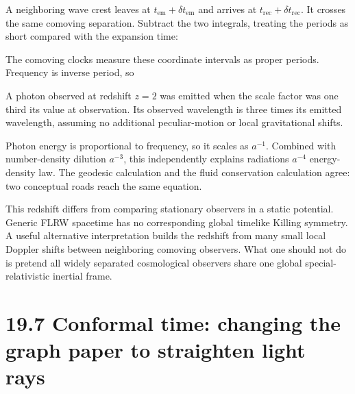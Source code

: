 \documentclass[
  11pt,
  letterpaper,
  oneside,
  openany]{scrbook}
\begin{document}
A neighboring wave crest leaves at
\(t_{\mathrm{em}}+\delta t_{\mathrm{em}}\) and arrives at
\(t_{\mathrm{rec}}+\delta t_{\mathrm{rec}}\). It crosses the same
comoving separation. Subtract the two integrals, treating the periods as
short compared with the expansion time:

\begin{center}
\begingroup
{}
\ifdim\wd\grmathbox>\linewidth
\resizebox{\linewidth}{!}{\usebox{\grmathbox}}
\else\usebox{\grmathbox}\fi
\endgroup
\end{center}

The comoving clocks measure these coordinate intervals as proper
periods. Frequency is inverse period, so

\begin{center}
\begingroup
{}
\ifdim\wd\grmathbox>\linewidth
\resizebox{\linewidth}{!}{\usebox{\grmathbox}}
\else\usebox{\grmathbox}\fi
\endgroup
\end{center}

A photon observed at redshift \(z=2\) was emitted when the scale factor
was one third its value at observation. Its observed wavelength is three
times its emitted wavelength, assuming no additional peculiar-motion or
local gravitational shifts.

Photon energy is proportional to frequency, so it scales as \(a^{-1}\).
Combined with number-density dilution \(a^{-3}\), this independently
explains radiation\textquotesingle s \(a^{-4}\) energy-density law. The
geodesic calculation and the fluid conservation calculation agree: two
conceptual roads reach the same equation.

This redshift differs from comparing stationary observers in a static
potential. Generic FLRW spacetime has no corresponding global timelike
Killing symmetry. A useful alternative interpretation builds the
redshift from many small local Doppler shifts between neighboring
comoving observers. What one should not do is pretend all widely
separated cosmological observers share one global special-relativistic
inertial frame.

\hypertarget{conformal-time-changing-the-graph-paper-to-straighten-light-rays}{%
\section{19.7 Conformal time: changing the graph paper to straighten
light
rays}\label{conformal-time-changing-the-graph-paper-to-straighten-light-rays}}
\end{document}
